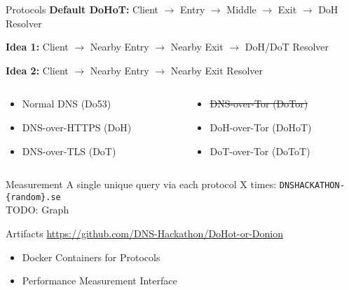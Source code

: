 \documentclass[xcolor=x11names,dvipsnames,aspectratio=169]{beamer}
\begin{document}
    \begin{frame}{Protocols}
        \textbf{Default DoHoT:}
        Client $\rightarrow$
        Entry $\rightarrow$
        Middle $\rightarrow$
        Exit $\rightarrow$
        DoH Resolver

        \vspace{1em}
        \textbf{Idea 1:}
        Client $\rightarrow$
        Nearby Entry $\rightarrow$
        Nearby Exit $\rightarrow$
        DoH/DoT Resolver

        \vspace{1em}
        \textbf{Idea 2:}
        Client $\rightarrow$
        Nearby Entry $\rightarrow$
        Nearby Exit Resolver

        \vspace{2em}

        \begin{columns}
            \begin{column}{.5\textwidth}
                \begin{itemize}
                    \item Normal DNS (Do53)
                    \item DNS-over-HTTPS (DoH)
                    \item DNS-over-TLS (DoT)
                \end{itemize}
            \end{column}
            \begin{column}{.5\textwidth}
                \begin{itemize}
                    \item \sout{DNS-over-Tor (DoTor)}
                    \item DoH-over-Tor (DoHoT)
                    \item DoT-over-Tor (DoToT)
                \end{itemize}
            \end{column}
        \end{columns}
    \end{frame}

    \begin{frame}{Measurement}
        A single unique query via each protocol X times:
        \texttt{DNSHACKATHON-\{random\}.se}\\
        \vspace{2em}
        TODO: Graph
    \end{frame}

    \begin{frame}{Artifacts}
        \url{https://github.com/DNS-Hackathon/DoHot-or-Donion}
        \begin{itemize}
            \item Docker Containers for Protocols
            \item Performance Measurement Interface
        \end{itemize}
    \end{frame}
\end{document}

